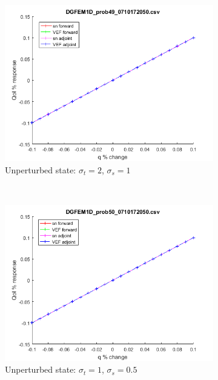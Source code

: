 \documentclass{article}
\newcommand{\sigt}{\sigma_t}
\newcommand{\sigs}{\sigma_s}
\begin{document}
\begin{figure}[H]
\label{InHomoPertq}
\centering
\begin{subfigure}{.65\textwidth}
  \centering
  \includegraphics[width=.98\linewidth]{figures/49qSens.png}
  \caption{Unperturbed state: $\sigt=2$, $\sigs=1$}
  \label{fig:sfig1}
\end{subfigure}%
\\
\begin{subfigure}{.65\textwidth}
  \centering
  \includegraphics[width=.98\linewidth]{figures/50qSens.png}
  \caption{Unperturbed state: $\sigt=1$, $\sigs=0.5$}
  \label{fig:sfig2}
\end{subfigure}
\\
\begin{subfigure}{.65\textwidth}

\end{subfigure}
\end{figure}
\end{document}
